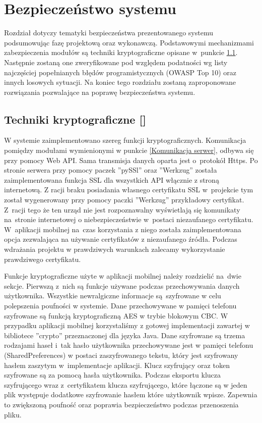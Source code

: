 \newpage
\section{Bezpieczeństwo systemu \textsl{\NazwaSys}} \label{sec:bezpieczenstwo}
Rozdział dotyczy tematyki bezpieczeństwa prezentowanego systemu podsumowując fazę projektową oraz wykonawczą. Podstawowymi mechanizmami zabezpieczenia modułów są techniki kryptograficzne opisane w~punkcie \ref{sec:techniki kryptograficzne}. Następnie zostaną one zweryfikowane pod względem podatności wg listy najczęściej popełnianych błędów programistycznych (OWASP Top 10) oraz innych losowych sytuacji. Na koniec tego rozdziału zostaną zaproponowane rozwiązania pozwalające na poprawę bezpieczeństwa systemu.

\subsection{Techniki kryptograficzne [\StudentB]}\label{sec:techniki kryptograficzne}
W systemie \textsl{\NazwaSys} zaimplementowano szereg funkcji kryptograficznych. Komunikacja pomiędzy modułami wymienionymi w punkcie \ref{Komunikacja serwer}, odbywa się przy pomocy Web API. Sama transmisja danych oparta jest o~protokół Https. Po stronie serwera przy pomocy paczek ''pySSl'' oraz ''Werkzug'' została zaimplementowana funkcja SSL dla wszystkich API włącznie z stroną internetową. Z racji braku posiadania własnego certyfikatu SSL w~projekcie tym został wygenerowany przy pomocy paczki ''Werkzug'' przykładowy certyfikat. Z~racji tego że ten urząd nie jest rozpoznawalny wyświetlają się komunikaty na~stronie internetowej o niebezpieczeństwie w~postaci niezaufanego certyfikatu. W~aplikacji mobilnej na~czas korzystania z niego została zaimplementowana opcja zezwalająca na używanie certyfikatów z niezaufanego źródła. Podczas wdrażania projektu w prawdziwych warunkach zalecamy wykorzystanie prawdziwego certyfikatu.

Funkcje kryptograficzne użyte w aplikacji mobilnej należy rozdzielić na~dwie sekcje. Pierwszą z~nich są funkcje używane podczas przechowywania danych użytkownika. Wszystkie newralgiczne informacje są~szyfrowane w celu polepszenia poufności w systemie. Dane przechowywane w pamięci telefonu szyfrowane są funkcją kryptograficzną AES w trybie blokowym CBC. W przypadku aplikacji mobilnej korzystaliśmy z gotowej implementacji zawartej w bibliotece ''crypto'' przeznaczonej dla języka Java. Dane szyfrowane są trzema rodzajami haseł i~tak hasło użytkownika przechowywane jest w pamięci telefonu (SharedPreferences) w postaci zaszyfrowanego tekstu, który jest szyfrowany hasłem zaszytym w~implementacje aplikacji. Klucz szyfrujący oraz token szyfrowane są za pomocą hasła użytkownika. Podczas eksportu klucza szyfrującego wraz z~certyfikatem klucza szyfrującego, które łączone są w jeden plik   występuje dodatkowe szyfrowanie hasłem które użytkownik wpisze. Zapewnia to zwiększoną poufność oraz poprawia bezpieczeństwo podczas przenoszenia pliku.                

